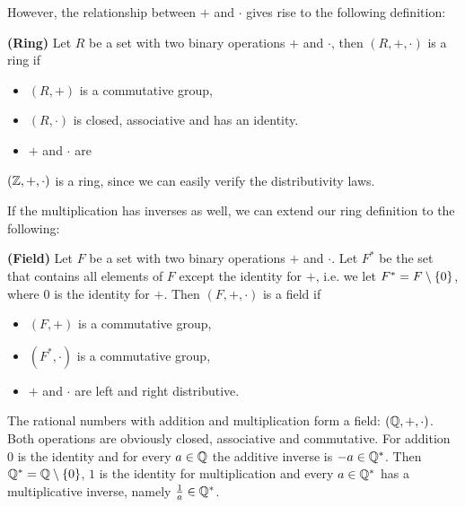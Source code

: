 However, the relationship between $+$ and $\cdot$ gives rise to the following
definition:

\begin{definition}{\textbf{(Ring)}}
  Let $R$ be a set with two binary operations $+$ and $\cdot$, then
  $(R,+,\cdot)$ is a ring if
  \begin{itemize}
  \item $(R,+)$ is a commutative group,
  \item $(R,\cdot)$ is closed, associative and has an identity.
  \item $+$ and $\cdot$ are 
  \end{itemize}
\end{definition}

\example $(\mathbb{Z},+,\cdot)$ is a ring, since we can easily verify the distributivity
laws.

If the multiplication has inverses as well, we can extend our ring definition to
the following:

\begin{definition}{\textbf{(Field)}}
  Let $F$ be a set with two binary operations $+$ and $\cdot$. Let $F^*$ be the
  set that contains all elements of $F$ except the identity for $+$, i.e. we let
  $F^*=F\setminus\{0\}$, where $0$ is the identity for $+$. Then $(F,+,\cdot)$
  is a field if
  \begin{itemize}
  \item $(F,+)$ is a commutative group,
  \item $(F^*,\cdot)$ is a commutative group,
  \item $+$ and $\cdot$ are left and right distributive. 
  \end{itemize}
\end{definition}

\example The rational numbers with addition and multiplication form a field:
$(\mathbb{Q},+,\cdot)$. Both operations are obviously closed, associative and
commutative. For addition $0$ is the identity and for every $a\in\mathbb{Q}$ the
additive inverse is $-a\in\mathbb{Q}^*$.  Then $\mathbb{Q}^*=\mathbb{Q}\setminus\{0\}$, $1$ is the
identity for multiplication and every $a\in\mathbb{Q}^*$ has a multiplicative inverse,
namely $\frac1a\in\mathbb{Q}^*$.


